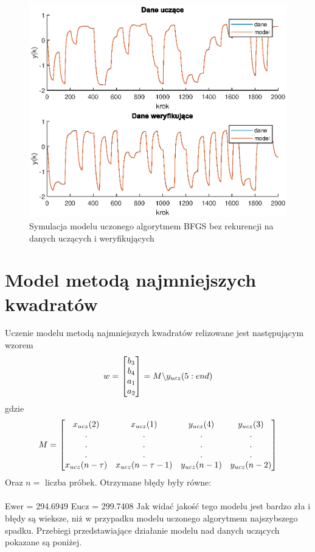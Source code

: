 		\begin{figure}[h!]
			\centering
			\includegraphics[width=\linewidth]{img/BFGS_ARX_d.eps}
			\caption{Symulacja modelu uczonego algorytmem BFGS bez rekurencji na danych uczących i weryfikujących}
			\label{fig:bfgs_arx_d}
		\end{figure}
		
		\newpage
	\section{Model metodą najmniejszych kwadratów}
		\label{sec:mnk}
		Uczenie modelu metodą najmniejszych kwadratów relizowane jest następującym wzorem
		\begin{equation}
		\begin{tabular}{l}
		$w = $ $\begin{bmatrix}b_3\\b_4\\a_1\\a_2\end{bmatrix}$ $=M\backslash y_{ucz}(5:end)$
		\end{tabular}
		\label{eq:mnk}
		\end{equation}
		gdzie
		\begin{equation}
		\begin{tabular}{l}
		$M = $ $\begin{bmatrix}x_{ucz}(2)&x_{ucz}(1)&y_{ucz}(4)&y_{ucz}(3)\\.&.&.&.\\.&.&.&.\\.&.&.&.\\x_{ucz}(n-\tau)&x_{ucz}(n-\tau -1)&y_{ucz}(n-1)&y_{ucz}(n-2)\end{bmatrix}$
		\end{tabular}
		\label{eq:M_mnk}
		\end{equation}
		Oraz $n =$ liczba próbek.
		Otrzymane błędy były równe:\\\\
		Ewer = 294.6949
		Eucz = 299.7408
		Jak widać jakość tego modelu jest bardzo zła i błędy są wieksze, niż w przypadku modelu uczonego algorytmem najszybszego spadku.
		Przebiegi przedstawiające działanie modelu nad danych uczących pokazane są poniżej.
		
